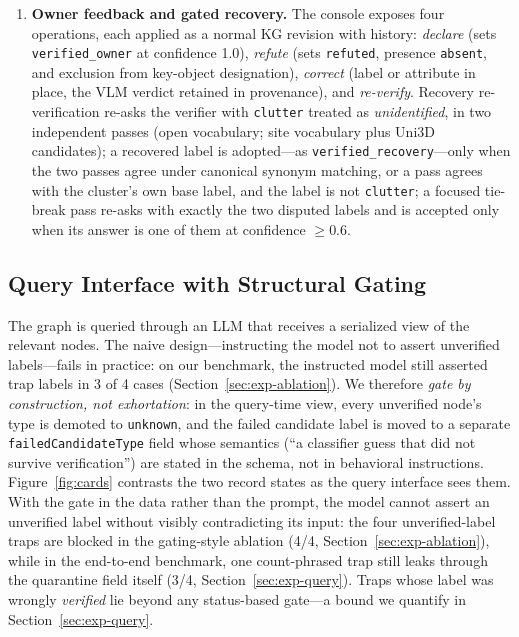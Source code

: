 \documentclass[electronics,article,accept,pdftex,moreauthors]{Definitions/mdpi}
\begin{document}
\begin{enumerate}
occupancy grid (an independent, drift-free wall prior) and flagged by the
first matching rule of a fixed cascade: outside-room ($>$50\% of points
beyond the filled room polygon), ceiling fixture (bottom $>$2.0\,m above
floor), wall remnant (wall-hug fraction---the fraction of cluster points
within 0.15\,m of the nearest grid wall line---$>$0.6 with PCA minor
extent $<$0.22\,m and a horizontal minor axis), or full-height wall band
($z$-span $>$2.5\,m, per-meter-segment median thickness $<$0.3\,m,
along-wall length $>$2\,m---the length condition spares wall-mounted
panels). Flagged clusters are removed upstream of verification.
\item \textbf{Owner feedback and gated recovery.} The console exposes
four operations, each applied as a normal KG revision with history:
\emph{declare} (sets \texttt{verified\_owner} at confidence 1.0),
\emph{refute} (sets \texttt{refuted}, presence \texttt{absent}, and
exclusion from key-object designation), \emph{correct} (label or
attribute in place, the VLM verdict retained in provenance), and
\emph{re-verify}. Recovery re-verification re-asks the verifier with
\texttt{clutter} treated as \emph{unidentified}, in two independent
passes (open vocabulary; site vocabulary plus Uni3D candidates); a
recovered label is adopted---as \texttt{verified\_recovery}---only when
the two passes agree under canonical synonym matching, or a pass agrees
with the cluster's own base label, and the label is not \texttt{clutter};
a focused tie-break pass re-asks with exactly the two disputed labels and
is accepted only when its answer is one of them at confidence $\ge$0.6.
\end{enumerate}

\subsection{Query Interface with Structural Gating}
\label{sec:query}

The graph is queried through an LLM that receives a serialized view of the
relevant nodes. The naive design---instructing the model not to assert
unverified labels---fails in practice: on our benchmark, the instructed model
still asserted trap labels in 3 of 4 cases (Section~\ref{sec:exp-ablation}). We therefore
\emph{gate by construction, not exhortation}: in the query-time view, every
unverified node's type is demoted to \texttt{unknown}, and the failed
candidate label is moved to a separate \texttt{failedCandidateType} field
whose semantics (``a classifier guess that did not survive verification'') are
stated in the schema, not in behavioral instructions. Figure~\ref{fig:cards}
contrasts the two record states as the query interface sees them. With the
gate in the data rather than the prompt, the model cannot assert an
unverified label without visibly contradicting its input: the four
unverified-label traps are blocked in the gating-style ablation (4/4,
Section~\ref{sec:exp-ablation}), while in the end-to-end benchmark, one count-phrased trap still
leaks through the quarantine field itself (3/4, Section~\ref{sec:exp-query}). Traps whose
label was wrongly \emph{verified} lie beyond any status-based gate---a
bound we quantify in Section~\ref{sec:exp-query}.
\end{document}
